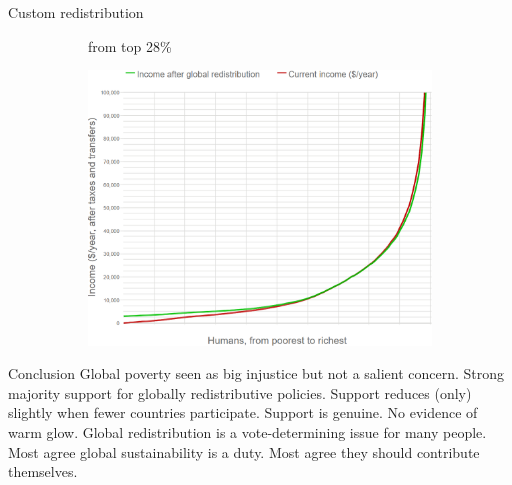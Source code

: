 \documentclass[aspectratio=169,xcolor=dvipsnames, 11pt,mathserif]{beamer}
\begin{document}
\begin{frame}{Custom redistribution \href{run:../figures/questionnaire/survey_custom_redistr.mp4}{} \href{https://bit.ly/custom_redistr}{}}
{\begin{figure}
      \begin{subfigure}{.2\textwidth}
        \bbs \ip {}
        \ip {} from top 28\% 
        \ee
      \end{subfigure}\begin{subfigure}{.8\textwidth}
        \includegraphics[height=.8\textheight]{../figures/all/custom_redistr_mean.png}
      \end{subfigure}
    \end{figure}}
\end{frame}

\begin{frame}{Conclusion}
\bbsp
\ip Global poverty seen as big injustice but not a salient concern.
\ip Strong majority support for globally redistributive policies.
\ip Support reduces (only) slightly when fewer countries participate.
\ip Support is genuine. No evidence of warm glow.
\ip Global redistribution is a vote-determining issue for many people. %
\ip Most agree global sustainability is a duty.
\ip Most agree they should contribute themselves.
\ee
\end{frame}
\end{document}
